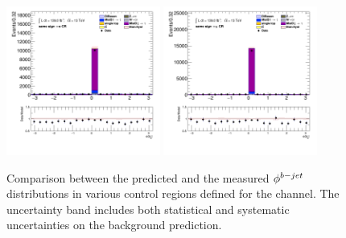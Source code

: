 \begin{figure}[!htp]
\begin{center}
			\includegraphics[width=0.45\textwidth]{chapters/chapter6_HPlus/images/taulep/bjet_0_phi_SS_TAUEL.png} 
			\includegraphics[width=0.45\textwidth]{chapters/chapter6_HPlus/images/taulep/bjet_0_phi_SS_TAUMU.png} \\
			\end{center}
			\caption{
			Comparison between the predicted and the measured $\phi^{b-jet}$ distributions in various control regions defined for the \taulep channel. The uncertainty band includes both statistical and systematic uncertainties on the background prediction. 
			}
			\label{fig:bkg-phi-bjet-taulep}
		\end{figure}

